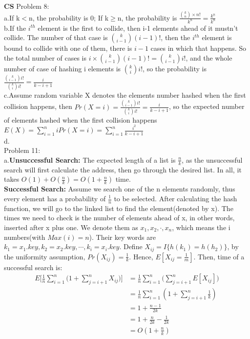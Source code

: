 \documentclass{article}
\begin{document}
\normalsize
\setlength\parindent{0em}\textbf{CS} Problem 8:\\
a.If k$<$n, the probability is 0; If k$\geq$n, the probability is $\frac{\binom{k}{n}\times n!}{k^n} = \frac{k^{\underline n}}{k^n}$\\
b.If the $i^{th}$ element is the first to collide, then i-1 elements ahead of it mustn't collide. The number of that case is $\binom{k}{i-1}(i-1)!$, then the $i^{th}$ element is bound to collide with one of them, there is $i-1$ cases in which that happens. So the total number of cases is $i\times \binom{k}{i-1}(i-1)!=\binom{k}{i-1}i!$, and the whole number of case of hashing i elements is $\binom{k}{i}i!$, so the probability is $\frac{\binom{k}{i-1}i!}{\binom{k}{i}i!}=\frac{i}{k-i+1}$\\
c.Assume random variable X denotes the elements number hashed when the first collision happens, then $Pr(X=i)=\frac{\binom{k}{i-1}i!}{\binom{k}{i}i!}=\frac{i}{k-i+1}$, so the expected number of elements hashed when the first collision happens $E(X)=\sum_{i=1}^{n}iPr(X=i)=\sum_{i=1}^{n}\frac{i^2}{k-i+1}$\\
d.\\
Problem 11:\\
a.\textbf{Unsuccessful Search: }The expected length of a list is $\frac{n}{k}$, as the unsuccessful search will first calculate the address, then go through the desired list. In all, it takes $O(1)+O(\frac{n}{k})=O(1+\frac{n}{k})$ time.\\
\textbf{Successful Search: }Assume we search one of the n elements randomly, thus every element has a probability of $\frac{1}{n}$ to be selected. After calculating the hash function, we will go to the linked list to find the element(denoted by x). The times we need to check is the number of elements ahead of x, in other words, inserted after x plus one. We denote them as $x_1, x_2, \cdot, x_n$, which means the i numbers(with $Max(i)=n$). Their key words are $k_1=x_1.key, k_2=x_2.key,\cdots, k_i=x_i.key$. Define $X_{ij}=I\{h(k_1)=h(h_2)\}$, by the uniformity assumption, $Pr(X_{ij})=\frac{1}{k}$. Hence, $E[X_{ij}=\frac{1}{m}]$. Then, time of a successful search is:
\begin{equation*}
\begin{aligned}
E\Big[\frac{1}{n}\sum_{i=1}^{n}\Big(1+\sum_{j=i+1}^{n}X_{ij}\Big)\Big]&=
\frac{1}{n}\sum_{i=1}^{n}\Big(\sum_{j=i+1}^{n}E[X_{ij}]\Big)\\
&=\frac{1}{n}\sum_{i=1}^{n}(1+\sum_{j=i+1}^{n}\frac{1}{k})\\&=1+\frac{n-1}{2k}\\
&=1+\frac{n}{2k}-\frac{1}{2k}\\
&=O(1+\frac{n}{k})
\end{aligned}
\end{equation*}
\end{document}
